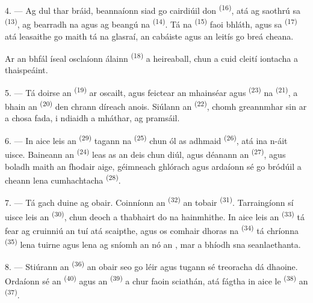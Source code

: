 4. --- Ag dul thar bráid, beannaíonn siad go cairdiúil don 
\textsuperscript{(16)}, atá ag saothrú sa 
\textsuperscript{(13)}, ag bearradh na  agus ag beangú na
 \textsuperscript{(14)}. Tá na 
\textsuperscript{(15)} faoi bhláth, agus sa 
\textsuperscript{(17)} atá leasaithe go maith tá na glasraí, an cabáiste agus an
leitís go breá cheana.

Ar an bhfál íseal osclaíonn  álainn \textsuperscript{(18)} a
heireaball, chun a cuid cleití iontacha a thaispeáint.

\VUsaut{3.0mm}

5. --- Tá doirse an  \textsuperscript{(19)} ar oscailt, agus
feictear an mhainséar agus  \textsuperscript{(23)} na 
\textsuperscript{(21)}, a bhain an 
\textsuperscript{(20)} den chrann díreach anois. Siúlann an 
\textsuperscript{(22)}, chomh greannmhar sin ar a chosa fada, i ndiaidh a mháthar,
ag pramsáil.

6. --- In aice leis an  \textsuperscript{(29)} tagann na
 \textsuperscript{(25)} chun ól as  adhmaid
\textsuperscript{(26)}, atá ina n-áit uisce. Baineann an 
\textsuperscript{(24)} leas as an deis chun diúl, agus déanann an 
\textsuperscript{(27)}, agus boladh maith an fhodair aige, géimneach ghlórach agus
ardaíonn sé go bródúil a cheann lena  cumhachtacha
\textsuperscript{(28)}.

7. --- Tá gach duine ag obair. Coinníonn an 
\textsuperscript{(32)}  an tobair \textsuperscript{(31)}. Tarraingíonn
sí uisce leis an  \textsuperscript{(30)}, chun deoch a thabhairt do
na hainmhithe. In aice leis an  \textsuperscript{(33)} tá fear ag
cruinniú an tuí atá scaipthe, agus os comhair dhoras na 
\textsuperscript{(34)} tá  chríonna \textsuperscript{(35)} lena
tuirne agus lena  ag sníomh an  nó an
, mar a bhíodh sna seanlaethanta.

\VUsaut{3.0mm}
\VUsaut{3.0mm}

8. --- Stiúrann an  \textsuperscript{(36)} an obair seo go léir
agus tugann sé treoracha dá dhaoine. Ordaíonn sé an 
\textsuperscript{(40)} agus an  \textsuperscript{(39)} a chur faoin
sciathán, atá fágtha in aice le  \textsuperscript{(38)} an
 \textsuperscript{(37)}.

